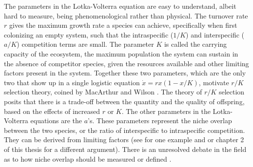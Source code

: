The parameters in the Lotka-Volterra equation are easy to understand, albeit hard to measure, being phenomenological rather than physical. 
The turnover rate $r$ gives the maximum growth rate a species can achieve, specifically when first colonizing an empty system, such that the intraspecific ($1/K$) and interspecific ($a/K$) competition terms are small. 
The parameter $K$ is called the carrying capacity of the ecosystem, the maximum population the system can sustain in the absence of competitor species, given the resources available and other limiting factors present in the system. 
Together these two parameters, which are the only two that show up in a single logistic equation $\dot{x}=rx(1-x/K)$, motivate $r/K$ selection theory, coined by MacArthur and Wilson \cite{MacArthur1967a}. 
The theory of $r/K$ selection posits that there is a trade-off between the quantity and the quality of offspring, based on the effects of increased $r$ or $K$. 
%
The other parameters in the Lotka-Volterra equations are the $a$'s. 
These parameters represent the niche overlap between the two species, or the ratio of interspecific to intraspecific competition. 
They can be derived from limiting factors (see \cite{MacArthur1967} for one example and \cite{MacArthur1970} or chapter 2 of this thesis for a different argument).  %
There is an unresolved debate in the field as to how niche overlap should be measured or defined \cite{Klopfer1961,Pianka1973,Pianka1974,Abrams1977,Hurlbert1978,Connell1980,Abrams1980,Schoener1985,Chesson1990,Leibold1995,Chesson2008}. %

